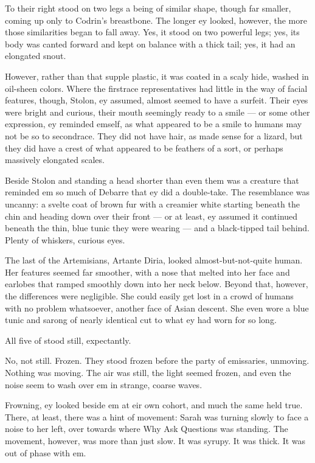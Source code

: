 To their right stood on two legs a being of similar shape, though far smaller, coming up only to Codrin's breastbone. The longer ey looked, however, the more those similarities began to fall away. Yes, it stood on two powerful legs; yes, its body was canted forward and kept on balance with a thick tail; yes, it had an elongated snout.

However, rather than that supple plastic, it was coated in a scaly hide, washed in oil-sheen colors. Where the firstrace representatives had little in the way of facial features, though, Stolon, ey assumed, almost seemed to have a surfeit. Their eyes were bright and curious, their mouth seemingly ready to a smile — or some other expression, ey reminded emself, as what appeared to be a smile to humans may not be so to secondrace. They did not have hair, as made sense for a lizard, but they did have a crest of what appeared to be feathers of a sort, or perhaps massively elongated scales.

Beside Stolon and standing a head shorter than even them was a creature that reminded em so much of Debarre that ey did a double-take. The resemblance was uncanny: a svelte coat of brown fur with a creamier white starting beneath the chin and heading down over their front — or at least, ey assumed it continued beneath the thin, blue tunic they were wearing — and a black-tipped tail behind. Plenty of whiskers, curious eyes.

The last of the Artemisians, Artante Diria, looked almost-but-not-quite human. Her features seemed far smoother, with a nose that melted into her face and earlobes that ramped smoothly down into her neck below. Beyond that, however, the differences were negligible. She could easily get lost in a crowd of humans with no problem whatsoever, another face of Asian descent. She even wore a blue tunic and sarong of nearly identical cut to what ey had worn for so long.

All five of stood still, expectantly.

No, not still. Frozen. They stood frozen before the party of emissaries, unmoving. Nothing was moving. The air was still, the light seemed frozen, and even the noise seem to wash over em in strange, coarse waves.

Frowning, ey looked beside em at eir own cohort, and much the same held true. There, at least, there was a hint of movement: Sarah was turning slowly to face a noise to her left, over towards where Why Ask Questions was standing. The movement, however, was more than just slow. It was syrupy. It was thick. It was out of phase with em.

